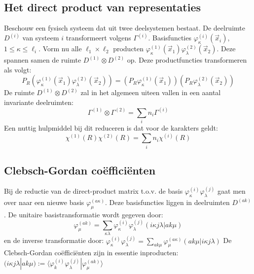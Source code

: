 \documentclass[twoside]{report}
\begin{document}
\subsection{Het direct product van representaties}
Beschouw een fysisch systeem dat uit twee deelsystemen bestaat. De deelruimte
$D^{(i)}$ van systeem $i$ transformeert volgens $\Gamma^{(i)}$. Basisfuncties
$\varphi^{(i)}_{\kappa}(\vec{x}_i)$, $1\leq\kappa\leq\ell_i$. Vorm nu alle
$\ell_1\times\ell_2$ producten $\varphi^{(1)}_{\kappa}(\vec{x}_1)\varphi^{(2)}_{\lambda}(\vec{x}_2)$.
Deze spannen samen de ruimte $D^{(1)}\otimes D^{(2)}$ op.
\npar
Deze productfuncties transformeren als volgt:
\[
P_R(\varphi^{(1)}_{\kappa}(\vec{x}_1)\varphi^{(2)}_{\lambda}(\vec{x}_2))=(P_R\varphi^{(1)}_{\kappa}(\vec{x}_1))(P_R\varphi^{(2)}_{\lambda}(\vec{x}_2))
\]
De ruimte $D^{(1)}\otimes D^{(2)}$ zal in het algemeen uiteen vallen in een
aantal invariante deelruimten:
\[
\Gamma^{(1)}\otimes\Gamma^{(2)}=\sum_i n_i\Gamma^{(i)}
\]
Een nuttig hulpmiddel bij dit reduceren is dat voor de karakters geldt:
\[
\chi^{(1)}(R)\chi^{(2)}(R)=\sum_i n_i\chi^{(i)}(R)
\]

\subsection{Clebsch-Gordan co\"effici\"enten}
Bij de reductie van de direct-product matrix t.o.v. de basis $\varphi_{\kappa}^{(i)}\varphi_{\lambda}^{(j)}$
gaat men over naar een nieuwe basis $\varphi_{\mu}^{(a\kappa)}$. Deze basisfuncties
liggen in deelruimten $D^{(ak)}$. De unitaire basistransformatie wordt gegeven
door:
\[
\varphi_{\mu}^{(ak)}=\sum_{\kappa\lambda}\varphi^{(i)}_{\kappa}\varphi^{(j)}_{\lambda}(i\kappa j\lambda|ak\mu)
\]
en de inverse transformatie door:
$\displaystyle\varphi^{(i)}_{\kappa}\varphi^{(j)}_{\lambda}=\sum_{ak\mu}\varphi_{\mu}^{(a\kappa)}(ak\mu|i\kappa j\lambda)$
\npar
De Clebsch-Gordan co\"effici\"enten zijn in essentie inproducten:
$(i\kappa j\lambda|ak\mu):=\langle\varphi_k^{(i)}\varphi_{\lambda}^{(j)}|\varphi_{\mu}^{(ak)}\rangle$
\end{document}
